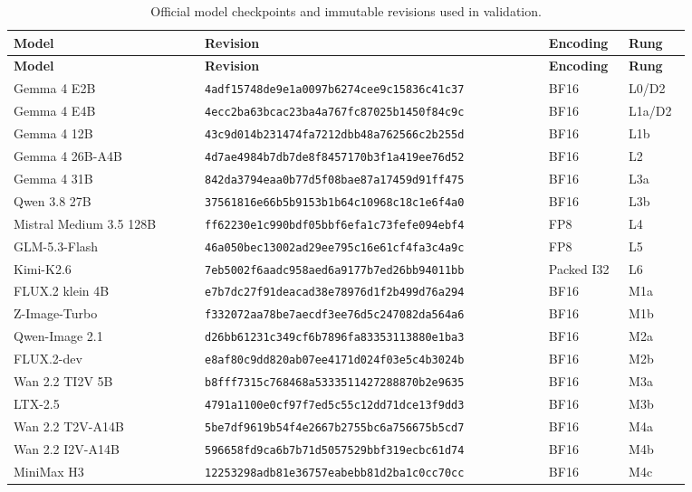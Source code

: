 {\scriptsize
\begin{longtable}{p{0.25\linewidth}p{0.45\linewidth}p{0.09\linewidth}p{0.08\linewidth}}
\caption{Official model checkpoints and immutable revisions used in validation.}\label{tab:model-inventory}\\
\toprule
\textbf{Model} & \textbf{Revision} & \textbf{Encoding} & \textbf{Rung} \\
\midrule
\endfirsthead
\toprule
\textbf{Model} & \textbf{Revision} & \textbf{Encoding} & \textbf{Rung} \\
\midrule
\endhead
\bottomrule
\endfoot
Gemma 4 E2B & \texttt{4adf15748de9e1a0097b6274cee9c15836c41c37} & BF16 & L0/D2 \\
Gemma 4 E4B & \texttt{4ecc2ba63bcac23ba4a767fc87025b1450f84c9c} & BF16 & L1a/D2 \\
Gemma 4 12B & \texttt{43c9d014b231474fa7212dbb48a762566c2b255d} & BF16 & L1b \\
Gemma 4 26B-A4B & \texttt{4d7ae4984b7db7de8f8457170b3f1a419ee76d52} & BF16 & L2 \\
Gemma 4 31B & \texttt{842da3794eaa0b77d5f08bae87a17459d91ff475} & BF16 & L3a \\
Qwen 3.8 27B & \texttt{37561816e66b5b9153b1b64c10968c18c1e6f4a0} & BF16 & L3b \\
Mistral Medium 3.5 128B & \texttt{ff62230e1c990bdf05bbf6efa1c73fefe094ebf4} & FP8 & L4 \\
GLM-5.3-Flash & \texttt{46a050bec13002ad29ee795c16e61cf4fa3c4a9c} & FP8 & L5 \\
Kimi-K2.6 & \texttt{7eb5002f6aadc958aed6a9177b7ed26bb94011bb} & Packed I32 & L6 \\
FLUX.2 klein 4B & \texttt{e7b7dc27f91deacad38e78976d1f2b499d76a294} & BF16 & M1a \\
Z-Image-Turbo & \texttt{f332072aa78be7aecdf3ee76d5c247082da564a6} & BF16 & M1b \\
Qwen-Image 2.1 & \texttt{d26bb61231c349cf6b7896fa83353113880e1ba3} & BF16 & M2a \\
FLUX.2-dev & \texttt{e8af80c9dd820ab07ee4171d024f03e5c4b3024b} & BF16 & M2b \\
Wan 2.2 TI2V 5B & \texttt{b8fff7315c768468a5333511427288870b2e9635} & BF16 & M3a \\
LTX-2.5 & \texttt{4791a1100e0cf97f7ed5c55c12dd71dce13f9dd3} & BF16 & M3b \\
Wan 2.2 T2V-A14B & \texttt{5be7df9619b54f4e2667b2755bc6a756675b5cd7} & BF16 & M4a \\
Wan 2.2 I2V-A14B & \texttt{596658fd9ca6b7b71d5057529bbf319ecbc61d74} & BF16 & M4b \\
MiniMax H3 & \texttt{12253298adb81e36757eabebb81d2ba1c0cc70cc} & BF16 & M4c \\
\end{longtable}}

